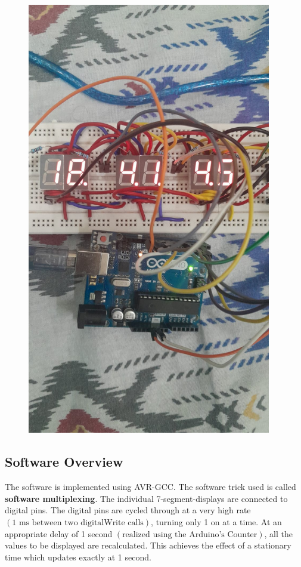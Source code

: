 \documentclass[a4paper,12pt]{article}
\begin{document}
\begin{figure}
  \begin{center}
    \includegraphics[width=0.95\textwidth]{figs/circuit_picture.jpeg}
  \end{center}
  \caption{}\label{fig:}
\end{figure}

\subsection*{Software Overview}
The software is implemented using AVR-GCC. The software trick used is called \textbf{software multiplexing}. The individual 7-segment-displays are connected to digital pins. The digital pins are cycled through at a very high rate $\left(\text{1 ms between two digitalWrite calls}\right)$, turning only 1 on at a time. At an appropriate delay of 1 second $\left(\text{realized using the Arduino's Counter}\right)$, all the values to be displayed are recalculated. This achieves the effect of a stationary
time which updates exactly at 1 second.
\end{document}
